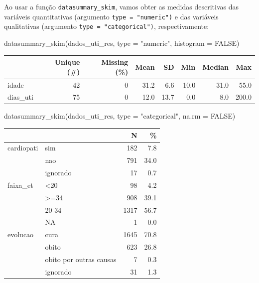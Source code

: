 \documentclass[
  letterpaper,
  DIV=11,
  numbers=noendperiod]{scrreprt}
\newenvironment{Shaded}{\begin{snugshade}}{\end{snugshade}}
\newcommand{\AttributeTok}[1]{\textcolor[rgb]{0.40,0.45,0.13}{#1}}
\newcommand{\ConstantTok}[1]{\textcolor[rgb]{0.56,0.35,0.01}{#1}}
\newcommand{\FunctionTok}[1]{\textcolor[rgb]{0.28,0.35,0.67}{#1}}
\newcommand{\NormalTok}[1]{\textcolor[rgb]{0.00,0.23,0.31}{#1}}
\newcommand{\StringTok}[1]{\textcolor[rgb]{0.13,0.47,0.30}{#1}}
\begin{document}
Ao usar a função \texttt{datasummary\_skim}, vamos obter as medidas
descritivas das variáveis quantitativas (argumento
\texttt{type\ =\ "numeric")} e das variáveis qualitativas (argumento
\texttt{type\ =\ "categorical")}, respectivamente:

\begin{Shaded}
\begin{Highlighting}[]
\FunctionTok{datasummary\_skim}\NormalTok{(dados\_uti\_res,}
  \AttributeTok{type =} \StringTok{"numeric"}\NormalTok{,}
  \AttributeTok{histogram =} \ConstantTok{FALSE}\NormalTok{)}
\end{Highlighting}
\end{Shaded}

\begin{table}
\centering
\begin{tabular}[t]{lrrrrrrr}
\toprule
  & Unique (\#) & Missing (\%) & Mean & SD & Min & Median & Max\\
\midrule
idade & 42 & 0 & \num{31.2} & \num{6.6} & \num{10.0} & \num{31.0} & \num{55.0}\\
dias\_uti & 75 & 0 & \num{12.0} & \num{13.7} & \num{0.0} & \num{8.0} & \num{200.0}\\
\bottomrule
\end{tabular}
\end{table}

\begin{Shaded}
\begin{Highlighting}[]
\FunctionTok{datasummary\_skim}\NormalTok{(dados\_uti\_res,}
  \AttributeTok{type =} \StringTok{"categorical"}\NormalTok{, }\AttributeTok{na.rm =} \ConstantTok{FALSE}\NormalTok{)}
\end{Highlighting}
\end{Shaded}

\begin{table}
\centering
\begin{tabular}[t]{llrr}
\toprule
  &    & N & \%\\
\midrule
cardiopati & sim & 182 & \num{7.8}\\
 & nao & 791 & \num{34.0}\\
 & ignorado & 17 & \num{0.7}\\
faixa\_et & <20 & 98 & \num{4.2}\\
 & >=34 & 908 & \num{39.1}\\
 & 20-34 & 1317 & \num{56.7}\\
 & NA & 1 & \num{0.0}\\
evolucao & cura & 1645 & \num{70.8}\\
 & obito & 623 & \num{26.8}\\
 & obito por outras causas & 7 & \num{0.3}\\
 & ignorado & 31 & \num{1.3}\\
\bottomrule
\end{tabular}
\end{table}
\end{document}
